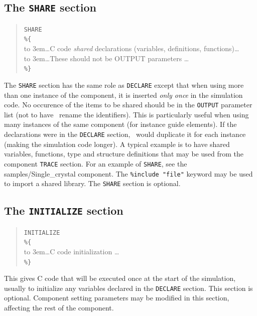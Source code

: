 \subsection{The \texttt{SHARE} section}
\label{s:comp-share}
\begin{quote}
  \texttt{SHARE} \\
  \verb|%{| \\
  \hbox to 3em{}\ldots C code \emph{shared} declarations (variables, definitions, functions)\ldots \\
  \hbox to 3em{}\ldots These should not be OUTPUT parameters \ldots \\
  \verb|%}|
\end{quote}

The \texttt{SHARE} section has the same role as \texttt{DECLARE} except that when using more than one instance of the component, it is inserted \emph{only once} in the simulation code. No occurence of the items to be shared should be in the \texttt{OUTPUT} parameter list (not to have \MCS\ rename the identifiers).
This is particularly useful when using many instances of the same component (for instance guide elements). If the declarations were in the \texttt{DECLARE} section, \MCS\ would duplicate it for each instance (making the simulation code longer).
A typical example is to have shared variables, functions, type and structure definitions that may be used from the component \texttt{TRACE} section. For an
example of \texttt{SHARE}, see the samples/Single\_crystal
component. The \verb+%include "file"+ keyword may be used to import
a shared library. The \texttt{SHARE} section is optional.

\subsection{The \texttt{INITIALIZE} section}
\label{s:comp-initialize}

\begin{quote}
  \texttt{INITIALIZE} \\
  \verb|%{| \\
  \hbox to 3em{}\ldots C code initialization \ldots \\
  \verb|%}|
\end{quote}
This gives C code that will be executed once at the start of the
simulation, usually to initialize any variables declared in the
\texttt{DECLARE} section. This section is optional. Component setting parameters may be modified in this section, affecting the rest of the component.



